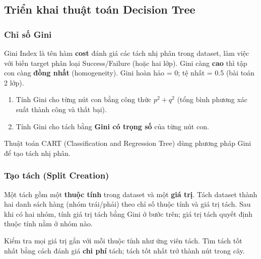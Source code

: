 \subsection{Triển khai thuật toán Decision Tree}

\subsubsection{Chỉ số Gini}

\begin{dinhnghia}[title={Gini Index}]
Gini Index là tên hàm \textbf{cost} đánh giá các tách nhị phân trong dataset, làm việc với biến target phân loại Success/Failure (hoặc hai lớp).
Gini càng \textbf{cao} thì tập con càng \textbf{đồng nhất} (homogeneity).
Gini hoàn hảo = 0; tệ nhất = 0.5 (bài toán 2 lớp).
\end{dinhnghia}

\begin{phuongphap}[title={Tính Gini cho một tách}]
\begin{enumerate}
  \item Tính Gini cho từng nút con bằng công thức $p^2 + q^2$ (tổng bình phương xác suất thành công và thất bại).
  \item Tính Gini cho tách bằng \textbf{Gini có trọng số} của từng nút con.
\end{enumerate}
Thuật toán CART (Classification and Regression Tree) dùng phương pháp Gini để tạo tách nhị phân.
\end{phuongphap}

\subsubsection{Tạo tách (Split Creation)}

\begin{dinhnghia}[title={Split}]
Một tách gồm một \textbf{thuộc tính} trong dataset và một \textbf{giá trị}.
Tách dataset thành hai danh sách hàng (nhóm trái/phải) theo chỉ số thuộc tính và giá trị tách.
Sau khi có hai nhóm, tính giá trị tách bằng Gini ở bước trên; giá trị tách quyết định thuộc tính nằm ở nhóm nào.
\end{dinhnghia}

\begin{phuongphap}[title={Đánh giá mọi tách}]
Kiểm tra mọi giá trị gắn với mỗi thuộc tính như ứng viên tách.
Tìm tách tốt nhất bằng cách đánh giá \textbf{chi phí} tách; tách tốt nhất trở thành nút trong cây.
\end{phuongphap}

